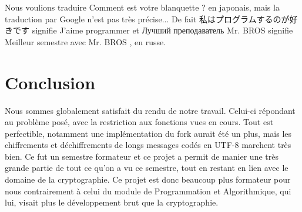 \documentclass[12pt]{article}
\theoremstyle{definition}
\begin{document}
\begin{CJK}{UTF8}{min}
Nous voulions traduire \og Comment est votre blanquette ? \fg{} en japonais, mais la traduction par Google n'est pas très précise... De fait \og 私はプログラムするのが好きです \fg{} signifie \og J'aime programmer \fg{} et \og Лучший преподаватель Mr. BROS \fg{} signifie  \og Meilleur semestre avec Mr. BROS \fg{}, en russe.
\section{Conclusion}
Nous sommes globalement satisfait du rendu de notre travail. Celui-ci répondant au problème posé, avec la restriction aux fonctions vues en cours. Tout est perfectible, notamment une implémentation du fork aurait été un plus, mais les chiffrements et déchiffrements de longs messages codés en \textsf{UTF-8} marchent très bien. Ce fut un semestre formateur et ce projet a permit de manier une très grande partie de tout ce qu'on a vu ce semestre, tout en restant en lien avec le domaine de la cryptographie. Ce projet est donc beaucoup plus formateur pour nous contrairement à celui du module de Programmation et Algorithmique, qui lui, visait plus le développement brut que la cryptographie.
\end{CJK}
\end{document}
